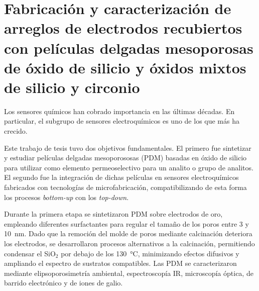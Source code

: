 \cleardoublepage

\mtcaddchapter[Resumen]

\section*{\centering\large{\bfseries{Fabricación y caracterización de arreglos de electrodos recubiertos con películas delgadas mesoporosas de óxido de silicio y óxidos mixtos de silicio y circonio}}}

\vspace*{\fill}
Los sensores químicos han cobrado importancia en las últimas décadas. En particular, el subgrupo de sensores electroquímicos es uno de los que más ha crecido. 


Este trabajo de tesis tuvo dos objetivos fundamentales. El primero fue sintetizar y estudiar películas delgadas mesoporososas (PDM) basadas en óxido de silicio para utilizar como elemento permeoselectivo para un analito o grupo de analitos. El segundo fue la integración de dichas películas en sensores electroquímicos fabricados con tecnologías de microfabricación, compatibilizando de esta forma los procesos \textit{bottom-up} con los \textit{top-down}.

Durante la primera etapa se sintetizaron PDM sobre electrodos de oro, empleando diferentes surfactantes para regular el tamaño de los poros entre 3 y \SI{10}{\nm}. Dado que la remoción del molde de poros mediante calcinación deteriora los electrodos, se desarrollaron procesos alternativos a la calcinación, permitiendo condensar el SiO$_2$ por debajo de los \SI{130}{\celsius}, minimizando efectos difusivos y ampliando el espectro de sustratos compatibles. Las PDM se caracterizaron mediante elipsoporosimetría ambiental, espectroscopía IR, microscopía óptica, de barrido electrónico y de iones de galio.

